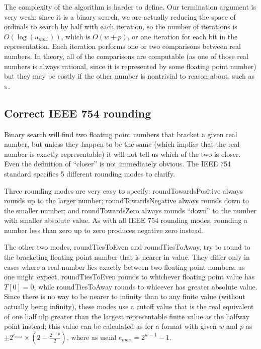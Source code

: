\documentclass[letterpaper,10pt]{article}
\begin{document}
The complexity of the algorithm is harder to define. Our termination argument is very weak: since it is a binary search, we are actually reducing the space of ordinals to search by half with each iteration, so the number of iterations is $O(\log(u_{max}))$, which is $O(w+p)$, or one iteration for each bit in the representation. Each iteration performs one or two comparisons between real numbers. In theory, all of the comparisons are computable (as one of those real numbers is always rational, since it is represented by some floating point number) but they may be costly if the other number is nontrivial to reason about, such as $\pi$.

\subsection{Correct IEEE 754 rounding}

Binary search will find two floating point numbers that bracket a given real number, but unless they happen to be the same (which implies that the real number is exactly representable) it will not tell us which of the two is closer. Even the definition of ``closer'' is not immediately obvious. The IEEE 754 standard specifies 5 different rounding modes to clarify.

Three rounding modes are very easy to specify: roundTowardsPositive always rounds up to the larger number; roundTowardsNegative always rounds down to the smaller number; and roundTowardsZero always rounds ``down'' to the number with smaller absolute value. As with all IEEE 754 rounding modes, rounding a number less than zero up to zero produces negative zero instead.

The other two modes, roundTiesToEven and roundTiesToAway, try to round to the bracketing floating point number that is nearer in value. They differ only in cases where a real number lies exactly between two floating point numbers: as one might expect, roundTiesToEven rounds to whichever floating point value has $T[0] = 0$, while roundTiesToAway rounds to whicever has greater absolute value. Since there is no way to be nearer to infinity than to any finite value (without actually being infinity), these modes use a cutoff value that is the real equivalent of one half ulp greater than the largest representable finite value as the halfway point instead; this value can be calculated as for a format with given $w$ and $p$ as $\pm 2^{e_{max}} \times (2 - \frac{2^{1-p}}{2})$, where as usual $e_{max} = 2^{w-1} - 1$.
\end{document}
